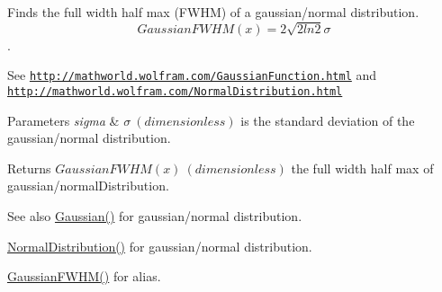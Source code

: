 Finds the full width half max (F\+W\+HM) of a gaussian/normal distribution. \[GaussianFWHM(x)=2\sqrt{2 ln 2} \sigma \]. 

See \href{http://mathworld.wolfram.com/GaussianFunction.html}{\tt http\+://mathworld.\+wolfram.\+com/\+Gaussian\+Function.\+html} and \href{http://mathworld.wolfram.com/NormalDistribution.html}{\tt http\+://mathworld.\+wolfram.\+com/\+Normal\+Distribution.\+html} 
\begin{DoxyParams}{Parameters}
{\em sigma} & $\sigma\ (dimensionless)$ is the standard deviation of the gaussian/normal distribution. \\
\hline
\end{DoxyParams}
\begin{DoxyReturn}{Returns}
$GaussianFWHM(x)\ (dimensionless)$ the full width half max of gaussian/normal\+Distribution. 
\end{DoxyReturn}
\begin{DoxySeeAlso}{See also}
\mbox{\hyperlink{group___e_g_x_math-_functions-_gaussian_ga647b46315081e299edc16a1c7f4e4032}{Gaussian()}} for gaussian/normal distribution. 

\mbox{\hyperlink{group___e_g_x_math-_functions-_gaussian_ga3747a7d047293d0e5310ba112bece627}{Normal\+Distribution()}} for gaussian/normal distribution. 

\mbox{\hyperlink{group___e_g_x_math-_functions-_gaussian_ga0b8be7b82cb82e871a2613e6a7180431}{Gaussian\+F\+W\+H\+M()}} for alias. 
\end{DoxySeeAlso}
